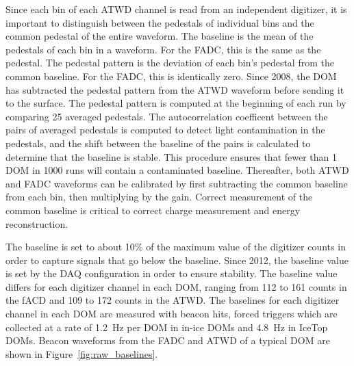 Since each bin of each ATWD channel is read from an independent
digitizer, it is important to distinguish between the pedestals of
individual bins and the common pedestal of the entire waveform. The
baseline is the mean of the pedestals of each bin in a waveform. For
the FADC, this is the same as the pedestal. The pedestal pattern is
the deviation of each bin's pedestal from the common baseline. For the
FADC, this is identically zero. Since 2008, the DOM has subtracted the
pedestal pattern from
the ATWD waveform before sending it to the surface. The pedestal pattern is computed at the beginning of each
run by comparing 25 averaged pedestals. The autocorrelation coefficent
between the pairs of averaged pedestals is computed to detect light
contamination in the pedestals, and the shift between the baseline of
the pairs is calculated to determine that the baseline is stable. This
procedure ensures that fewer than 1 DOM in 1000 runs will contain a
contaminated baseline. Thereafter, both ATWD
and FADC waveforms can be calibrated by first subtracting the common
baseline from each bin, then multiplying by the gain. Correct
measurement of the common baseline is critical to correct charge
measurement and energy reconstruction.

The baseline is set to about 10\% of the maximum value of the
digitizer counts in
order to capture signals that go below the baseline. Since 2012, the baseline value is set by the DAQ configuration in order to ensure
stability. The baseline value differs for each digitizer channel in
each DOM, ranging from 112 to 161 counts in the fACD and 109 to 172
counts in the ATWD. The baselines for each digitizer channel in each DOM are measured with
beacon hits, forced triggers which are collected at a rate of 1.2~Hz
per DOM
in in-ice DOMs and 4.8~Hz in IceTop DOMs. Beacon waveforms
from the FADC and ATWD of a typical DOM are shown in Figure~\ref{fig:raw_baselines}.

